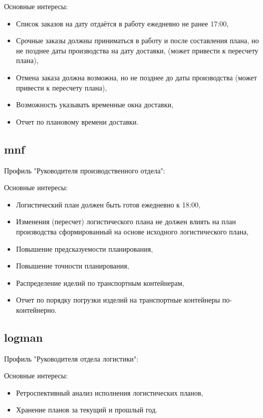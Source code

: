 Основные интересы:
\begin{itemize}
    \item Список заказов на дату отдаётся в работу ежедневно не ранее 17:00,
    \item Срочные заказы должны приниматься в работу и после составления плана, но не позднее даты производства на дату доставки, (может привести к пересчету плана),
    \item Отмена заказа должна возможна, но не позднее до даты производства (может привести к пересчету плана),
    \item Возможность указывать временные окна доставки,
    \item Отчет по плановому времени доставки.
\end{itemize}

\subsection{mnf}
\label{subsec:mnf}
Профиль "Руководителя производственного отдела":

Основные интересы:
\begin{itemize}
    \item Логистический план должен быть готов ежедневно к 18:00,
    \item Изменения (пересчет) логистического плана не должен влиять на план производства сформированный на основе исходного логистического плана,
    \item Повышение предсказуемости планирования,
    \item Повышение точности планирования,
    \item Распределение иделий по транспортным контейнерам,
    \item Отчет по порядку погрузки изделий на транспортные контейнеры по-контейнерно.
\end{itemize}

\subsection{logman}
\label{subsec:logman}
Профиль "Руководителя отдела логистики":

Основные интересы:
\begin{itemize}
    \item Ретроспективный анализ исполнения логистических планов,
    \item Хранение планов за текущий и прошлый год.
\end{itemize}

